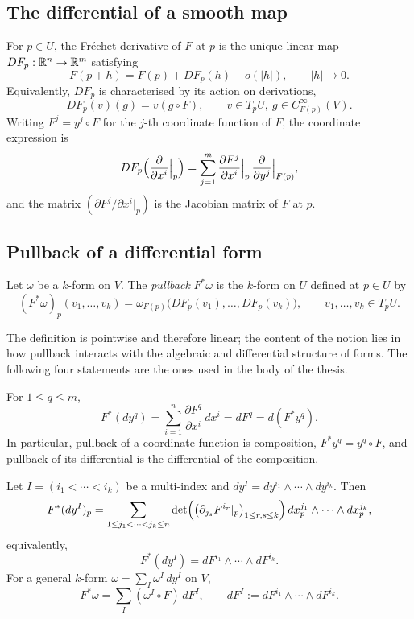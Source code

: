 \subsection{The differential of a smooth map}

For $p\in U$, the Fr\'echet derivative of $F$ at $p$ is the unique linear
map $DF_p:\mathbb R^n\to\mathbb R^m$ satisfying
\[
    F(p+h) = F(p) + DF_p(h) + o(|h|),
    \qquad |h|\to 0 .
\]
Equivalently, $DF_p$ is characterised by its action on derivations,
\[
    DF_p(v)(g) = v(g\circ F),
    \qquad v\in T_p U,\ g\in C^\infty_{F(p)}(V).
\]
Writing $F^j = y^j\circ F$ for the $j$-th coordinate function of $F$, the
coordinate expression is
\[
    DF_p\Bigl(\frac{\partial}{\partial x^i}\Big|_p\Bigr)
    =
    \sum_{j=1}^m
    \frac{\partial F^j}{\partial x^i}\Big|_p\,
    \frac{\partial}{\partial y^j}\Big|_{F(p)} ,
\]
and the matrix $(\partial F^j/\partial x^i|_p)$ is the Jacobian matrix of
$F$ at $p$.

\subsection{Pullback of a differential form}

\begin{definition}[Pullback]
\label{def:pullback}
Let $\omega$ be a $k$-form on $V$. The \emph{pullback} $F^*\omega$ is the
$k$-form on $U$ defined at $p\in U$ by
\[
    (F^*\omega)_p(v_1,\dots,v_k)
    =
    \omega_{F(p)}\bigl(DF_p(v_1),\dots,DF_p(v_k)\bigr),
    \qquad v_1,\dots,v_k\in T_p U .
\]
\end{definition}

The definition is pointwise and therefore linear; the content of the
notion lies in how pullback interacts with the algebraic and
differential structure of forms. The following four statements are the
ones used in the body of the thesis.

\begin{proposition}
\label{prop:pullback-1-form}
For $1\le q\le m$,
\[
    F^*(dy^q)
    =
    \sum_{i=1}^n \frac{\partial F^q}{\partial x^i}\, dx^i
    =
    dF^q
    =
    d(F^*y^q).
\]
In particular, pullback of a coordinate function is composition,
$F^*y^q = y^q\circ F$, and pullback of its differential is the
differential of the composition.
\end{proposition}

\begin{proposition}
\label{prop:pullback-k-form}
Let $I=(i_1<\cdots<i_k)$ be a multi-index and
$dy^I = dy^{i_1}\wedge\cdots\wedge dy^{i_k}$. Then
\[
    F^*(dy^I)_p
    =
    \sum_{1\le j_1<\cdots<j_k\le n}
    \det\Bigl(\bigl(\partial_{j_s}F^{i_r}|_p\bigr)_{1\le r,s\le k}\Bigr)
    \,
    dx^{j_1}_p\wedge\cdots\wedge dx^{j_k}_p ,
\]
equivalently,
\[
    F^*(dy^I) = dF^{i_1}\wedge\cdots\wedge dF^{i_k}.
\]
For a general $k$-form $\omega = \sum_I \omega^I\, dy^I$ on $V$,
\[
    F^*\omega = \sum_I (\omega^I\circ F)\, dF^I,
    \qquad
    dF^I := dF^{i_1}\wedge\cdots\wedge dF^{i_k}.
\]
\end{proposition}

